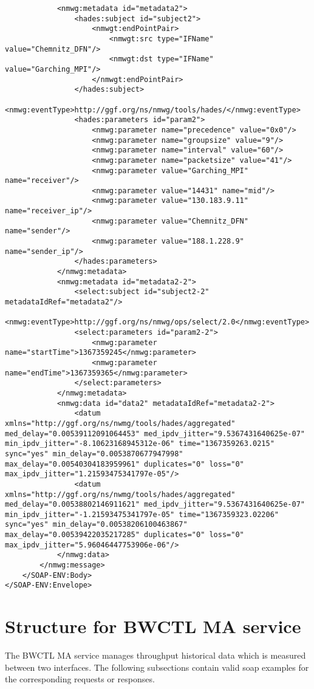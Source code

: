 \documentclass[a4paper,12pt,titlepage,hidelinks,fleqn]{article}
\begin{document}
\begin{flushleft}
\begin{framed}
\begin{lstlisting}
			<nmwg:metadata id="metadata2">
				<hades:subject id="subject2">
					<nmwgt:endPointPair>
						<nmwgt:src type="IFName" value="Chemnitz_DFN"/>
						<nmwgt:dst type="IFName" value="Garching_MPI"/>
					</nmwgt:endPointPair>
				</hades:subject>
				<nmwg:eventType>http://ggf.org/ns/nmwg/tools/hades/</nmwg:eventType>
				<hades:parameters id="param2">
					<nmwg:parameter name="precedence" value="0x0"/>
					<nmwg:parameter name="groupsize" value="9"/>
					<nmwg:parameter name="interval" value="60"/>
					<nmwg:parameter name="packetsize" value="41"/>
					<nmwg:parameter value="Garching_MPI" name="receiver"/>
					<nmwg:parameter value="14431" name="mid"/>
					<nmwg:parameter value="130.183.9.11" name="receiver_ip"/>
					<nmwg:parameter value="Chemnitz_DFN" name="sender"/>
					<nmwg:parameter value="188.1.228.9" name="sender_ip"/>
				</hades:parameters>
			</nmwg:metadata>
			<nmwg:metadata id="metadata2-2">
				<select:subject id="subject2-2" metadataIdRef="metadata2"/>
				<nmwg:eventType>http://ggf.org/ns/nmwg/ops/select/2.0</nmwg:eventType>
				<select:parameters id="param2-2">
					<nmwg:parameter name="startTime">1367359245</nmwg:parameter>
					<nmwg:parameter name="endTime">1367359365</nmwg:parameter>
				</select:parameters>
			</nmwg:metadata>
			<nmwg:data id="data2" metadataIdRef="metadata2-2">
				<datum xmlns="http://ggf.org/ns/nwmg/tools/hades/aggregated" med_delay="0.00539112091064453" med_ipdv_jitter="9.5367431640625e-07" min_ipdv_jitter="-8.10623168945312e-06" time="1367359263.0215" sync="yes" min_delay="0.0053870677947998" max_delay="0.00540304183959961" duplicates="0" loss="0" max_ipdv_jitter="1.21593475341797e-05"/>
				<datum xmlns="http://ggf.org/ns/nwmg/tools/hades/aggregated" med_delay="0.00538802146911621" med_ipdv_jitter="9.5367431640625e-07" min_ipdv_jitter="-1.21593475341797e-05" time="1367359323.02206" sync="yes" min_delay="0.00538206100463867" max_delay="0.00539422035217285" duplicates="0" loss="0" max_ipdv_jitter="5.96046447753906e-06"/>
			</nmwg:data>
		</nmwg:message>
	</SOAP-ENV:Body>
</SOAP-ENV:Envelope>
\end{lstlisting}
\end{framed}
\end{flushleft}

\section{Structure for BWCTL MA service}
\begin{flushleft}
The BWCTL MA service manages throughput historical data which is measured between two interfaces. The following subsections contain valid soap examples for the corresponding requests or responses.  
\end{flushleft}
\end{document}
